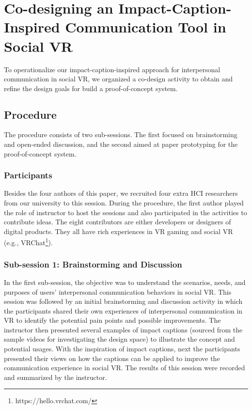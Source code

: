 \section{Co-designing an Impact-Caption-Inspired Communication Tool in Social VR}
To operationalize our impact-caption-inspired approach for interpersonal communication in social VR, we organized a co-design activity to obtain and refine the design goals for build a proof-of-concept system.

\subsection{Procedure}
The procedure consists of two sub-sessions. The first focused on brainstorming and open-ended discussion, and the second aimed at paper prototyping for the proof-of-concept system.

\subsubsection{Participants}
Besides the four authors of this paper, we recruited four extra HCI researchers from our university to this session. During the procedure, the first author played the role of instructor to host the sessions and also participated in the activities to contribute ideas. 
The eight contributors are either developers or designers of digital products. They all have rich experiences in VR gaming and social VR (e.g., VRChat\footnote{https://hello.vrchat.com/}).

\subsubsection{Sub-session 1: Brainstorming and Discussion}
In the first sub-session, the objective was to understand the scenarios, needs, and purposes of users' interpersonal communication behaviors in social VR. 
This session was followed by an initial brainstorming and discussion activity in which the participants shared their own experiences of interpersonal communication in VR to identify the potential pain points and possible improvements. 
The instructor then presented several examples of impact captions (sourced from the sample videos for investigating the design space) to illustrate the concept and potential usages. 
With the inspiration of impact captions, next the participants presented their views on how the captions can be applied to improve the communication experience in social VR.
The results of this session were recorded and summarized by the instructor.

